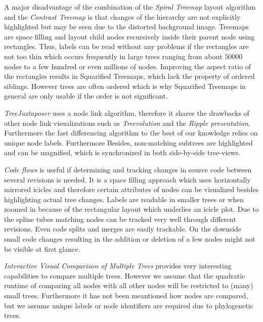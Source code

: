 A major disadvantage of the combination of the \emph{Spiral Treemap} layout algorithm and the \emph{Contrast Treemap} is that changes of the hierarchy are not explicitly highlighted but may be seen due to the distorted background image. Treemaps are space filling and layout child nodes recursively inside their parent node using rectangles. Thus, labels can be read without any problems if the rectangles are not too thin which occurs frequently in large trees ranging from about $50000$ nodes to a few hundred or even millions of nodes. Improving the aspect ratio of the rectangles results in Squarified Treemaps, which lack the property of ordered siblings. However trees are often ordered which is why Squarified Treemaps in general are only usable if the order is not significant.

\emph{TreeJuxtaposer} uses a node link algorithm, therefore it shares the drawbacks of other node link visualizations such as \emph{Treevolution} and the \emph{Ripple presentation}. Furthermore the fast differencing algorithm to the best of our knowledge relies on unique node labels. Furthermore Besides, non-matching subtrees are highlighted and can be magnified, which is synchronized in both side-by-side tree-views.

\emph{Code flows} is useful if determining and tracking changes in source code between several revisions is needed. It is a space filling approach which uses horizontally mirrored icicles and therefore certain attributes of nodes can be visualized besides highlighting actual tree changes. Labels are readable in smaller trees or when zoomed in because of the rectangular layout which underlies an icicle plot. Due to the spline tubes matching nodes can be tracked very well through different revisions. Even code splits and merges are easily trackable. On the downside small code changes resulting in the addition or deletion of a few nodes might not be visible at first glance.

\emph{Interactive Visual Comparison of Multiple Trees} provides very interesting capabilities to compare multiple trees. However we assume that the quadratic runtime of comparing all nodes with all other nodes will be restricted to (many) small trees. Furthermore it has not been meantioned how nodes are compared, but we assume unique labels or node identifiers are required due to phylogenetic trees.

